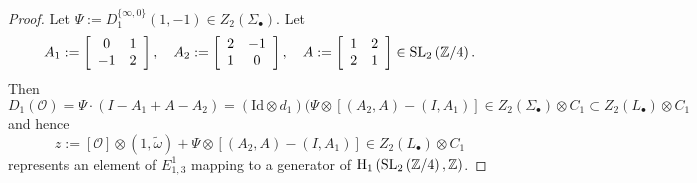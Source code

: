 \documentclass[12pt]{amsart}
\theoremstyle{definition}
\newcommand{\Z}{\Bbb{Z}}
\newcommand{\oct}{\mathcal{O}}%
\newcommand{\scyc}[1]{\left[ #1 \right]} %
\newcommand{\spl}[2]{\operatorname{SL}_{#1}\left(#2\right)}
\newcommand{\<}{\langle}
\renewcommand{\>}{\rangle}
\newcommand{\ho}[3]{\mathrm{H}_{#1}\left( #2,#3 \right)}
\begin{document}
\begin{proof}
Let $\Psi:=D_1^{\{ \infty,0\}}(1,-1)\in Z_2(\Sigma_\bullet)$. Let 
\[
A_1:=
\left[
\begin{array}{cc}
0&1\\
-1&2
\end{array}
\right],\quad A_2:=
\left[
\begin{array}{cc}
2&-1\\
1&0\\
\end{array}
\right],
\quad
A:=
\left[
\begin{array}{cc}
1&2\\
2&1\\
\end{array}
\right]\in\spl{2}{\Z/4}.
\]
Then
\[
D_1(\oct)=\Psi\cdot(I-A_1+A-A_2)=(\mathrm{Id}\otimes d_1)(\Psi\otimes [(A_2,A)-(I,A_1)]\in Z_2(\Sigma_\bullet)\otimes C_1\subset Z_2(L_\bullet)\otimes C_1
\]
and hence 
\[
z:=\scyc{\oct}\otimes (1,\tilde{\omega})+\Psi\otimes [(A_2,A)-(I,A_1)]\in Z_2(L_\bullet)\otimes C_1
\]
represents an element of $E^1_{1,3}$ mapping to a generator of $\ho{1}{\spl{2}{\Z/4}}{\Z}$.


\end{proof}
\end{document}
